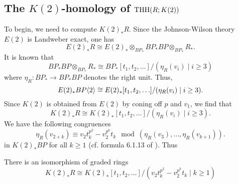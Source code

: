 \subsection{The $K(2)$-homology of $\operatorname{THH}(R;K(2))$}

To begin, we need to compute $K(2)_*R$. Since the Johnson-Wilson theory $E(2)$ is Landweber exact, one has 
\[
E(2)_*R\cong E(2)_*\otimes_{BP_*}BP_*BP\otimes_{BP_*}R_*.
\]
It is known that 
\[
BP_*BP\otimes_{BP_*}R_*\cong BP_*[t_1, t_2, \ldots]/(\eta_R(v_i)\mid i\geq 3)
\]
where $\eta_R:BP_*\to BP_*BP$ denotes the right unit. Thus, 
\[
E(2)_*BP\langle 2 \rangle\cong E(2)_*[t_1, t_2, \ldots]/(\eta_R(v_i)\mid i\geq 3).
\]
Since $K(2)$ is obtained from $E(2)$ by coning off $p$ and $v_1$, we find that 
\[
K(2)_*R\cong K(2)_*[t_1, t_2, \ldots]/(\eta_R(v_i)\mid i\geq 3).
\]
We have the following congruences
\[
\eta_R(v_{2+k})\equiv v_2t_k^{p^2}-v_2^{p^{k}}t_k \mod (\eta_R(v_{3}), \ldots , \eta_R(v_{k+1})).
\]
in $K(2)_*BP$ for all $k\geq 1$ (cf. formula 6.1.13 of \cite{greenbook}). Thus 

\begin{lem}
	There is an isomorphism of graded rings
	\[
	K(2)_*R\cong K(2)_*[t_1, t_2, \ldots ]/(v_2t_k^{p^2}-v_2^{p^k}t_k\mid k\geq 1)
	\]
\end{lem}

